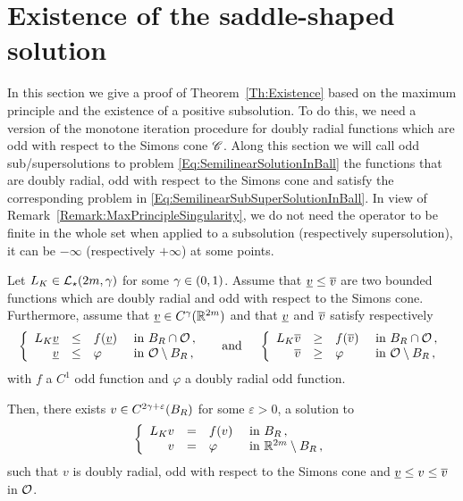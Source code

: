 \section{Existence of the saddle-shaped solution}
\label{Sec:Existence}


In this section we give a proof of Theorem~\ref{Th:Existence} based on the maximum principle and the existence of a positive subsolution. To do this, we need a version of the monotone iteration procedure for doubly radial functions which are odd with respect to the Simons cone $\mathscr{C}$. Along this section we will call odd sub/supersolutions to problem \eqref{Eq:SemilinearSolutionInBall} the functions that are doubly radial, odd with respect to the Simons cone and satisfy the corresponding problem in \eqref{Eq:SemilinearSubSuperSolutionInBall}. In view of Remark~\ref{Remark:MaxPrincipleSingularity}, we do not need the operator to be finite in the whole set when applied to a subsolution (respectively supersolution), it can be $-\infty$ (respectively $+\infty$) at some points.

\begin{proposition}
	\label{Prop:MonotoneIterationOdd}
	Let $L_K\in \mathcal{L}_\star(2m,\gamma)$ for some $\gamma\in (0,1)$. Assume that $\underline{v} \leq \overline{v}$ are two bounded functions which are doubly radial and odd with respect to the Simons cone. Furthermore, assume that $\underline{v}\in C^\gamma(\mathbb{R}^{2m})$ and that $\underline{v}$ and $\overline{v}$ satisfy respectively   
	\begin{equation}
	\label{Eq:SemilinearSubSuperSolutionInBall}
	\left\{\begin{array}{rcll}
	L_K\underline{v} & \leq & f(\underline{v}) & \textrm{ in } B_R \cap \mathcal{O}\,, \\
	\underline{v} & \leq & \varphi & \textrm{ in } \mathcal{O} \setminus B_R\,, 
	\end{array} \right.
	\quad \textrm{ and } \quad 
	\left\{\begin{array}{rcll}
	L_K\overline{v} & \geq & f(\overline{v}) & \textrm{ in } B_R \cap \mathcal{O}\,, \\
	\overline{v} & \geq & \varphi & \textrm{ in } \mathcal{O} \setminus B_R\,, 
	\end{array} \right.
	\end{equation}
	with $f$ a $C^1$ odd function and $\varphi$ a doubly radial odd function.
	
	Then, there exists $v\in C^{2\gamma+\varepsilon}(B_R)$ for some $\varepsilon>0$, a solution to
	\begin{equation}
	\label{Eq:SemilinearSolutionInBall}
	\left\{\begin{array}{rcll}
	L_K v & = & f(v) & \textrm{ in } B_R\,, \\
	v &=& \varphi &  \textrm{ in } \mathbb{R}^{2m} \setminus B_R\,, 
	\end{array} \right.
	\end{equation}
	such that $v$ is doubly radial, odd with respect to the Simons cone and  $\underline{v} \leq v \leq \overline{v}$ in $\mathcal{O}$.
\end{proposition}


